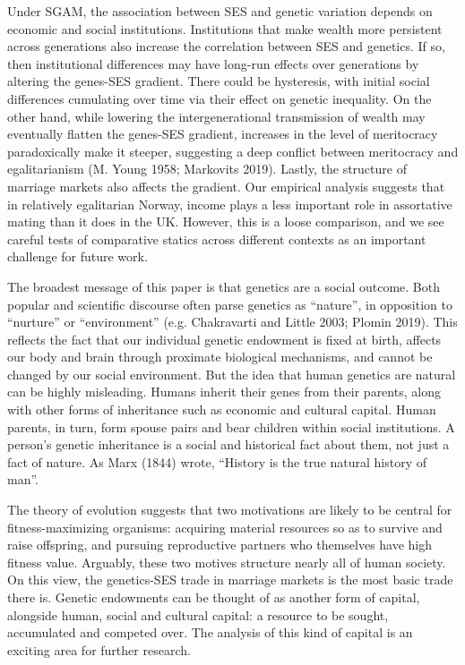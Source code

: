 \documentclass[
  12pt,
]{article}
\theoremstyle{definition}
\theoremstyle{definition}
\theoremstyle{definition}
\theoremstyle{definition}
\theoremstyle{remark}
\begin{document}
Under SGAM, the association between SES and genetic variation depends on
economic and social institutions. Institutions that make wealth more persistent
across generations also increase the correlation between SES and genetics. If
so, then institutional differences may have long-run effects over generations by
altering the genes-SES gradient. There could be hysteresis, with initial social
differences cumulating over time via their effect on genetic inequality. On the
other hand, while lowering the intergenerational transmission of wealth may
eventually flatten the genes-SES gradient, increases in the level of meritocracy
paradoxically make it steeper, suggesting a deep conflict between meritocracy
and egalitarianism (M. Young 1958; Markovits 2019). Lastly, the
structure of marriage markets also affects the gradient. Our empirical analysis
suggests that in relatively egalitarian Norway, income plays a less important role in
assortative mating than it does in the UK. However, this is a loose comparison,
and we see careful tests of comparative statics across different contexts as
an important challenge for future work.

The broadest message of this paper is that genetics are a social
outcome. Both popular and scientific discourse often parse genetics as
``nature'', in opposition to ``nurture'' or ``environment'' (e.g. Chakravarti and Little 2003; Plomin 2019). This reflects the fact that
our individual genetic endowment is fixed at birth, affects our body and brain
through proximate biological mechanisms, and cannot be changed by our social
environment. But the idea that human genetics are natural can be highly
misleading. Humans inherit their genes from their parents, along with other
forms of inheritance such as economic and cultural capital. Human parents, in
turn, form spouse pairs and bear children within social institutions. A person's
genetic inheritance is a social and historical fact about them, not just a
fact of nature. As Marx (1844) wrote, ``History is the true natural history of
man''.

The theory of evolution suggests that two motivations are likely to be
central for fitness-maximizing organisms: acquiring material resources so as to
survive and raise offspring, and pursuing reproductive partners who themselves have
high fitness value. Arguably, these two motives structure nearly all of human society.
On this view, the genetics-SES trade in marriage markets is the most basic trade
there is. Genetic endowments can be thought of as another form of capital,
alongside human, social and cultural capital: a resource to be sought,
accumulated and competed over. The analysis of this kind of capital is an
exciting area for further research.
\end{document}
